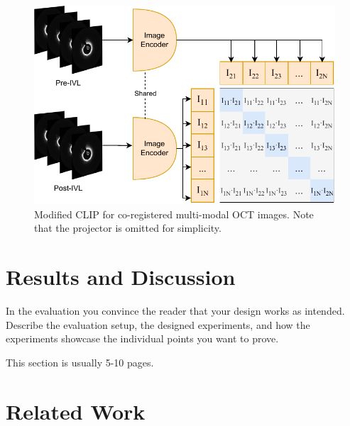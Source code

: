 \documentclass[a4paper,11pt,oneside]{report}
\begin{document}
\begin{figure}[b]
    \centering
    \includegraphics[width=0.6\linewidth]{figures/fig_implementation_clip_oct.pdf}
    \caption{Modified CLIP for co-registered multi-modal OCT images. Note that the projector is omitted for simplicity.}
    \label{fig:clip-oct}
\end{figure}

\chapter{Results and Discussion}

In the evaluation you convince the reader that your design works as intended.
Describe the evaluation setup, the designed experiments, and how the
experiments showcase the individual points you want to prove.

This section is usually 5-10 pages.


\chapter{Related Work}



\end{document}
